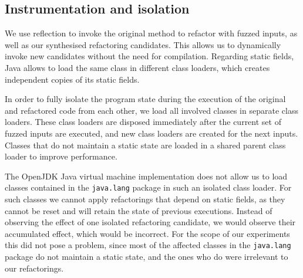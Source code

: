 \documentclass[sigconf,review,anonymous]{acmart}
\begin{document}
  
\subsection{Instrumentation and isolation}

We use reflection to invoke the original method to refactor with fuzzed inputs,
as well as our synthesised refactoring candidates. This allows us to dynamically
invoke new candidates without the need for compilation.
Regarding static fields, Java
allows to load the same class in different class loaders, which creates
independent copies of its static fields.

In order to fully isolate the program state during the execution of the original and refactored code from each other, we load all involved classes in separate
class loaders. These class loaders are disposed immediately after the current set
of fuzzed inputs are executed, and new class loaders are created for the next
inputs. %
Classes that do not maintain a static state are loaded in a shared
parent class loader to improve performance.

The OpenJDK Java virtual machine implementation does not allow us to load
classes contained in the \lstinline[breaklines=true]{java.lang} package in such an isolated class
loader. For such classes we cannot apply refactorings that depend on static
fields, as they cannot be reset and will retain the state of previous
executions. Instead of observing the effect of one isolated refactoring
candidate, we would observe their accumulated effect, which would be incorrect.
For the scope of our
experiments this did not pose a problem, since most of the affected classes in
the \lstinline[breaklines=true]{java.lang} package do not maintain a static state, and the ones who do
were irrelevant to our refactorings.



\end{document}
